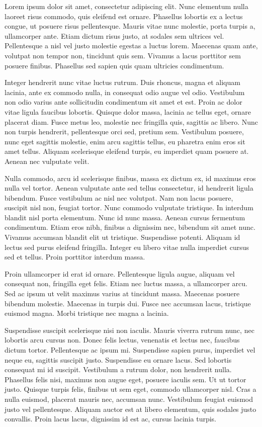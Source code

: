 \documentclass[twoside,openright,a4paper,11pt,french]{article}
\begin{document}
Lorem ipsum dolor sit amet, consectetur adipiscing elit. Nunc elementum nulla laoreet risus commodo, quis eleifend est ornare. Phasellus lobortis ex a lectus congue, ut posuere risus pellentesque. Mauris vitae nunc molestie, porta turpis a, ullamcorper ante. Etiam dictum risus justo, at sodales sem ultrices vel. Pellentesque a nisl vel justo molestie egestas a luctus lorem. Maecenas quam ante, volutpat non tempor non, tincidunt quis sem. Vivamus a lacus porttitor sem posuere finibus. Phasellus sed sapien quis quam ultricies condimentum.

Integer hendrerit nunc vitae luctus rutrum. Duis rhoncus, magna et aliquam lacinia, ante ex commodo nulla, in consequat odio augue vel odio. Vestibulum non odio varius ante sollicitudin condimentum sit amet et est. Proin ac dolor vitae ligula faucibus lobortis. Quisque dolor massa, lacinia ac tellus eget, ornare placerat diam. Fusce metus leo, molestie nec fringilla quis, sagittis ac libero. Nunc non turpis hendrerit, pellentesque orci sed, pretium sem. Vestibulum posuere, nunc eget sagittis molestie, enim arcu sagittis tellus, eu pharetra enim eros sit amet tellus. Aliquam scelerisque eleifend turpis, eu imperdiet quam posuere at. Aenean nec vulputate velit.

Nulla commodo, arcu id scelerisque finibus, massa ex dictum ex, id maximus eros nulla vel tortor. Aenean vulputate ante sed tellus consectetur, id hendrerit ligula bibendum. Fusce vestibulum ac nisl nec volutpat. Nam non lacus posuere, suscipit nisl non, feugiat tortor. Nunc commodo vulputate tristique. In interdum blandit nisl porta elementum. Nunc id nunc massa. Aenean cursus fermentum condimentum. Etiam eros nibh, finibus a dignissim nec, bibendum sit amet nunc. Vivamus accumsan blandit elit ut tristique. Suspendisse potenti. Aliquam id lectus sed purus eleifend fringilla. Integer eu libero vitae nulla imperdiet cursus sed et tellus. Proin porttitor interdum massa.

Proin ullamcorper id erat id ornare. Pellentesque ligula augue, aliquam vel consequat non, fringilla eget felis. Etiam nec luctus massa, a ullamcorper arcu. Sed ac ipsum ut velit maximus varius at tincidunt massa. Maecenas posuere bibendum molestie. Maecenas in turpis dui. Fusce nec accumsan lacus, tristique euismod magna. Morbi tristique nec magna a lacinia.

Suspendisse suscipit scelerisque nisi non iaculis. Mauris viverra rutrum nunc, nec lobortis arcu cursus non. Donec felis lectus, venenatis et lectus nec, faucibus dictum tortor. Pellentesque ac ipsum mi. Suspendisse sapien purus, imperdiet vel neque eu, sagittis suscipit justo. Suspendisse eu ornare lacus. Sed lobortis consequat mi id suscipit. Vestibulum a rutrum dolor, non hendrerit nulla. Phasellus felis nisi, maximus non augue eget, posuere iaculis sem. Ut ut tortor justo. Quisque turpis felis, finibus ut sem eget, commodo ullamcorper nisl. Cras a nulla euismod, placerat mauris nec, accumsan nunc. Vestibulum feugiat euismod justo vel pellentesque. Aliquam auctor est at libero elementum, quis sodales justo convallis. Proin lacus lacus, dignissim id est ac, cursus lacinia turpis.
\end{document}
